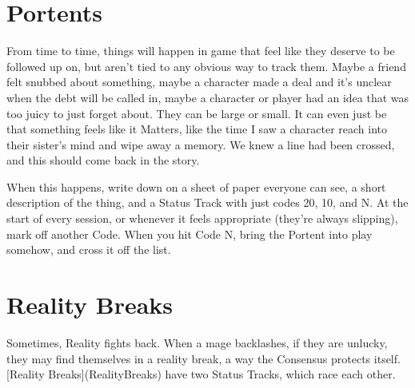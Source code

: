 \documentclass[
  oneside,
  statementpaper,
  9pt]{memoir}
\begin{document}
\hypertarget{portents}{%
\section{Portents}\label{portents}}

\begin{Narrator}

From time to time, things will happen in game that feel like they deserve to be followed up on, but aren't tied to any obvious way to track them. Maybe a friend felt snubbed about something, maybe a character made a deal and it's unclear when the debt will be called in, maybe a character or player had an idea that was too juicy to just forget about. They can be large or small. It can even just be that something feels like it Matters, like the time I saw a character reach into their sister's mind and wipe away a memory. We knew a line had been crossed, and this should come back in the story.

\end{Narrator}

\begin{MC}

When this happens, write down on a sheet of paper everyone can see, a short description of the thing, and a Status Track with just codes 20, 10, and N. At the start of every session, or whenever it feels appropriate (they're always slipping), mark off another Code. When you hit Code N, bring the Portent into play somehow, and cross it off the list.

\end{MC}

\hypertarget{reality-breaks-1}{%
\section{Reality Breaks}\label{reality-breaks-1}}

\begin{Narrator}

Sometimes, Reality fights back. When a mage backlashes, if they are unlucky, they may find themselves in a reality break, a way the Consensus protects itself. [Reality Breaks](RealityBreaks) have two Status Tracks, which race each other.

\end{Narrator}
\end{document}

